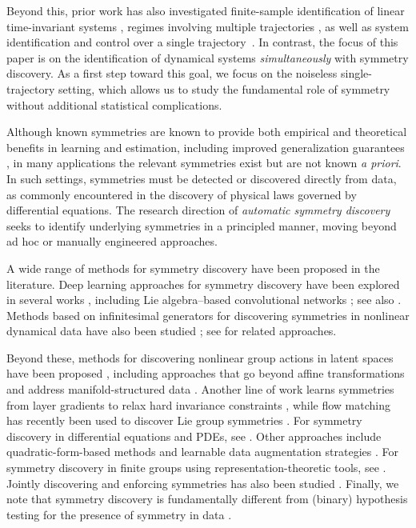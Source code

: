 \documentclass[11pt]{article}
\theoremstyle{plain}
\theoremstyle{definition}
\theoremstyle{remark}
\begin{document}
Beyond this, prior work has also investigated finite-sample identification of linear time-invariant systems \citep{sarkar2019near, sarkar2021finite}, regimes involving multiple trajectories \citep{tu2024learning}, as well as system identification and control over a single trajectory~\citep{fefferman2022optimal,carruth2022controlling,carruth2024almost}. In contrast, the focus of this paper is on the identification of dynamical systems \emph{simultaneously} with symmetry discovery. As a first step toward this goal, we focus on the noiseless single-trajectory setting, which allows us to study the fundamental role of symmetry without additional statistical complications.


Although known symmetries are known to provide both empirical and theoretical benefits in learning and estimation, including improved generalization guarantees \citep{tahmasebi2023exact, tahmasebi2023sample}, in many applications the relevant symmetries exist but are not known \emph{a priori}. In such settings, symmetries must be detected or discovered directly from data, as commonly encountered in the discovery of physical laws governed by differential equations. The research direction of \emph{automatic symmetry discovery} seeks to identify underlying symmetries in a principled manner, moving beyond ad hoc or manually engineered approaches.




A wide range of methods for symmetry discovery have been proposed in the literature. Deep learning approaches for symmetry discovery have been explored in several works \citep{desai2022symmetry, yang2023generative, JMLR:v26:24-2175}, including Lie algebra–based convolutional networks \citep{dehmamy2021automatic}; see also \citep{romero2022learning, ko2024learning, hu2025symmetry}. Methods based on infinitesimal generators for discovering symmetries in nonlinear dynamical data have also been studied \citep{pmlr-v267-hu25o}; see \citep{shaw2025cont} for related approaches.

Beyond these, methods for discovering nonlinear group actions in latent spaces have been proposed \citep{yang2024latent}, including approaches that go beyond affine transformations and address manifold-structured data \citep{shaw2024symmetry, bhat2025atlasd}. Another line of work learns symmetries from layer gradients to relax hard invariance constraints \citep{van2023learning}, while flow matching has recently been used to discover Lie group symmetries \citep{park2025discovering}. For symmetry discovery in differential equations and PDEs, see \citep{kreider2025model, hu2025governing, yang2025discovering, yang2024symmetry}. Other approaches include quadratic-form-based methods \citep{karjol2025learning} and learnable data augmentation strategies \citep{santos2025learning}. For symmetry discovery in finite groups using representation-theoretic tools, see \citep{huh2025a}. Jointly discovering and enforcing symmetries has also been studied \citep{otto2025unified}. Finally, we note that symmetry discovery is fundamentally different from (binary) hypothesis testing for the presence of symmetry in data \citep{soleymani2025robust}.
\end{document}
